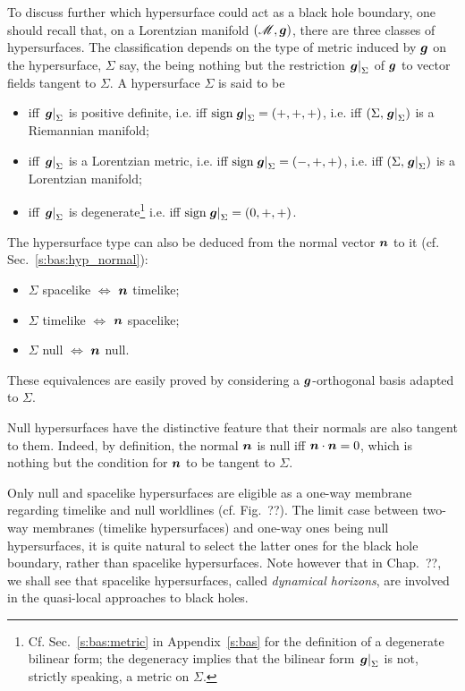 To discuss further which hypersurface could act as a black hole boundary,
one should recall that, on a Lorentzian manifold $(\mathscr{M},\bm{g})$, there are
three classes of hypersurfaces. The classification
depends on the type of metric induced by $\bm{g}$ on the
hypersurface, $\Sigma$ say, the
 being
nothing but the restriction $\left.\bm{g}\right| _{\Sigma}$ of $\bm{g}$
to vector fields tangent to $\Sigma$.
A hypersurface $\Sigma$ is said to be
\begin{itemize}
\item {} iff $\left.\bm{g}\right| _{\Sigma}$ is positive definite,
i.e. iff $\mathrm{sign} \left.\bm{g}\right| _{\Sigma} = (+,+,+)$,
i.e. iff $(\Sigma,  \left.\bm{g}\right| _{\Sigma})$ is a Riemannian manifold;
\item {} iff $\left.\bm{g}\right| _{\Sigma}$ is a Lorentzian metric,
i.e. iff $\mathrm{sign} \left.\bm{g}\right| _{\Sigma} = (-,+,+)$,
i.e. iff $(\Sigma,  \left.\bm{g}\right| _{\Sigma})$ is a Lorentzian manifold;
\item {} iff $\left.\bm{g}\right| _{\Sigma}$ is degenerate\footnote{
Cf. Sec.~\ref{s:bas:metric} in Appendix~\ref{s:bas} for the definition of a
degenerate bilinear form; the degeneracy
implies that the bilinear form $\left.\bm{g}\right| _{\Sigma}$ is not,
strictly speaking, a metric on $\Sigma$.}
i.e. iff $\mathrm{sign} \left.\bm{g}\right| _{\Sigma} = (0,+,+)$.
\end{itemize}
The hypersurface type can also be deduced from the normal vector
$\bm{n}$ to it (cf. Sec.~\ref{s:bas:hyp_normal}):
\begin{itemize}
\item $\Sigma$ spacelike $\iff$ $\bm{n}$ timelike;
\item $\Sigma$ timelike $\iff$ $\bm{n}$ spacelike;
\item $\Sigma$ null $\iff$ $\bm{n}$ null.
\end{itemize}
These equivalences are easily proved by considering a $\bm{g}$-orthogonal basis
adapted to $\Sigma$.

\begin{remark}
Null hypersurfaces have the distinctive feature that their normals are
also tangent to them. Indeed, by definition, the normal $\bm{n}$ is null iff
$\bm{n}\cdot\bm{n}=0$, which is nothing but the condition
for $\bm{n}$ to be tangent to $\Sigma$.
\end{remark}

Only null and spacelike hypersurfaces are eligible as a one-way membrane
regarding timelike and null worldlines (cf. Fig.~??).
The limit case between two-way membranes (timelike hypersurfaces)
and one-way ones being null hypersurfaces, it is quite natural to select the
latter ones for the black hole boundary, rather than spacelike hypersurfaces.
Note however that in Chap.~??, we shall see that spacelike hypersurfaces,
called \emph{dynamical
horizons}, are involved
in the quasi-local approaches to black holes.

